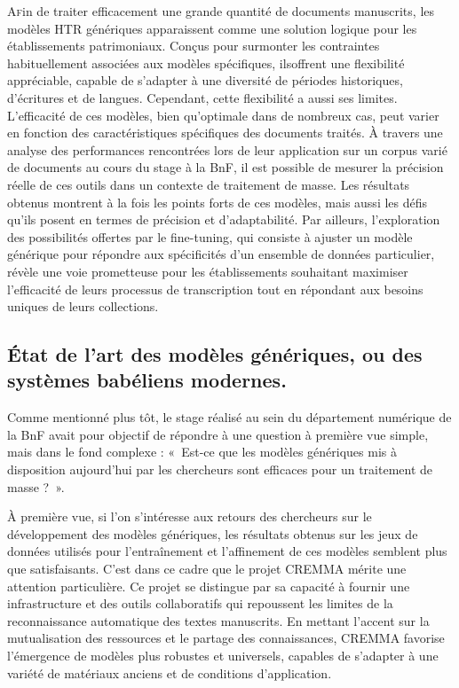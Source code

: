 \documentclass[a4paper,12pt,twoside]{book}
\begin{document}
	\lettrine{A}fin de traiter efficacement une grande quantité de documents manuscrits, les modèles HTR génériques apparaissent comme une solution logique pour les établissements patrimoniaux. Conçus pour surmonter les contraintes habituellement associées aux modèles spécifiques, ilsoffrent une flexibilité appréciable, capable de s’adapter à une diversité de périodes historiques, d’écritures et de langues. Cependant, cette flexibilité a aussi ses limites. L’efficacité de ces modèles, bien qu’optimale dans de nombreux cas, peut varier en fonction des caractéristiques spécifiques des documents traités. À travers une analyse des performances rencontrées lors de leur application sur un corpus varié de documents au cours du stage à la BnF, il est possible de mesurer la précision réelle de ces outils dans un contexte de traitement de masse. Les résultats obtenus montrent à la fois les points forts de ces modèles, mais aussi les défis qu’ils posent en termes de précision et d’adaptabilité. Par ailleurs, l’exploration des possibilités offertes par le fine-tuning, qui consiste à ajuster un modèle générique pour répondre aux spécificités d’un ensemble de données particulier, révèle une voie prometteuse pour les établissements souhaitant maximiser l’efficacité de leurs processus de transcription tout en répondant aux besoins uniques de leurs collections.
	
	\subsection{État de l'art des modèles génériques, ou des systèmes babéliens modernes.}
	
	Comme mentionné plus tôt, le stage réalisé au sein du département numérique de la BnF avait pour objectif de répondre à une question à première vue simple, mais dans le fond complexe : « Est-ce que les modèles génériques mis à disposition aujourd’hui par les chercheurs sont efficaces pour un traitement de masse ? ». 
	
	À première vue, si l’on s’intéresse aux retours des chercheurs sur le développement des modèles génériques, les résultats obtenus sur les jeux de données utilisés pour l’entraînement et l’affinement de ces modèles semblent plus que satisfaisants. C’est dans ce cadre que le projet CREMMA mérite une attention particulière. Ce projet se distingue par sa capacité à fournir une infrastructure et des outils collaboratifs qui repoussent les limites de la reconnaissance automatique des textes manuscrits. En mettant l’accent sur la mutualisation des ressources et le partage des connaissances, CREMMA favorise l’émergence de modèles plus robustes et universels, capables de s’adapter à une variété de matériaux anciens et de conditions d’application.
	
\end{document}

